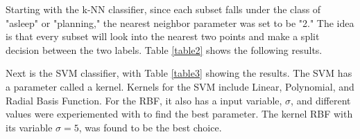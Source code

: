 \documentclass[conference,compsoc]{IEEEtran}
\begin{document}
Starting with the k-NN classifier, since each subset falls under the class of "asleep" or "planning," the nearest neighbor parameter 
was set to be "2." The idea is that every subset will look into the nearest two points and make a split decision between the two labels. 
Table \ref{table2} shows the following results.
\begin{table*}
	\caption{Accuracies for k-NN Classifier}
	\label{table2}
	\noindent{}

\end{table*}

Next is the SVM classifier, with Table \ref{table3} showing the results. The SVM has a parameter called a kernel. Kernels for the SVM include Linear, Polynomial, and Radial Basis Function.  For the RBF, it also has a input variable,  $\sigma$, and different values were experiemented with to find the best parameter. The kernel RBF with its variable $\sigma=5$, was found to be the best choice.
\begin{table*}
	\caption{Accuracies for SVM Classifier}
	\label{table3}
	\noindent{}

\end{table*}
\end{document}
